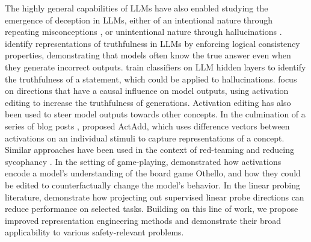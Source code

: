 The highly general capabilities of LLMs have also enabled studying the emergence of deception in LLMs, either of an intentional nature through repeating misconceptions \citet{truthfulqa}, or unintentional nature through hallucinations \citep{maynez-etal-2020-faithfulness, sep-lying-definition}. \citet{burns2022discovering} identify representations of truthfulness in LLMs by enforcing logical consistency properties, demonstrating that models often know the true answer even when they generate incorrect outputs. \citet{azaria2023internal} train classifiers on LLM hidden layers to identify the truthfulness of a statement, which could be applied to hallucinations. \citet{li2023inferencetime} focus on directions that have a causal influence on model outputs, using activation editing to increase the truthfulness of generations. Activation editing has also been used to steer model outputs towards other concepts. In the culmination of a series of blog posts \citep{turner2023understanding, turner2023behavioural, turner2023maze, turner2023steering}, \citep{turner2023activation} proposed ActAdd, which uses difference vectors between activations on an individual stimuli to capture representations of a concept. Similar approaches have been used in the context of red-teaming and reducing sycophancy \citep{rimsky2023red, rimsky2023reducing, rimsky2023modulating}. In the setting of game-playing, \citet{li2023emergent} demonstrated how activations encode a model's understanding of the board game Othello, and how they could be edited to counterfactually change the model's behavior. In the linear probing literature, \citet{elazar2021amnesic} demonstrate how projecting out supervised linear probe directions can reduce performance on selected tasks. Building on this line of work, we propose improved representation engineering methods and demonstrate their broad applicability to various safety-relevant problems.















